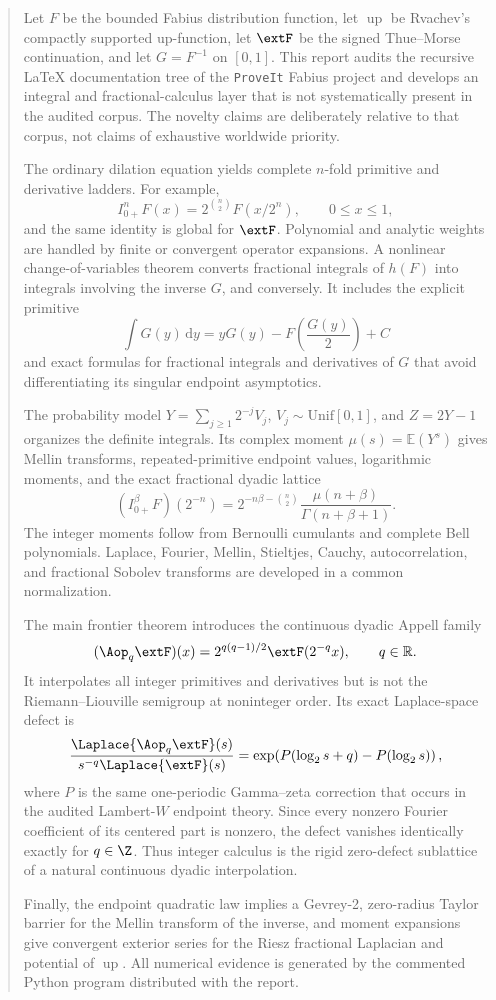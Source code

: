 \documentclass[11pt,oneside]{article}
\theoremstyle{definition}
\theoremstyle{remark}
\newcommand{\Up}{\operatorname{up}}
\newcommand{\E}{\mathbb E}
\newcommand{\R}{\mathbb R}
\newcommand{\dd}{\,\mathrm d}
\newcommand{\1}{\mathbf 1}
\begin{document}
\begin{abstract}
Let $F$ be the bounded Fabius distribution function, let $\Up$ be Rvachev's compactly
supported up-function, let $\extF$ be the signed Thue--Morse continuation, and let
$G=F^{-1}$ on $[0,1]$.  This report audits the recursive LaTeX documentation tree of the
\texttt{ProveIt} Fabius project and develops an integral and fractional-calculus layer that
is not systematically present in the audited corpus.  The novelty claims are deliberately
relative to that corpus, not claims of exhaustive worldwide priority.

The ordinary dilation equation yields complete $n$-fold primitive and derivative ladders.
For example,
\[
 I_{0+}^{n}F(x)=2^{\binom n2}F(x/2^n),\qquad 0\le x\le1,
\]
and the same identity is global for $\extF$.  Polynomial and analytic weights are handled by
finite or convergent operator expansions.  A nonlinear change-of-variables theorem converts
fractional integrals of $h(F)$ into integrals involving the inverse $G$, and conversely.  It
includes the explicit primitive
\[
 \int G(y)\dd y=yG(y)-F\!\left(\frac{G(y)}2\right)+C
\]
and exact formulas for fractional integrals and derivatives of $G$ that avoid differentiating
its singular endpoint asymptotics.

The probability model
$Y=\sum_{j\ge1}2^{-j}V_j$, $V_j\sim\mathrm{Unif}[0,1]$, and $Z=2Y-1$ organizes the
definite integrals.  Its complex moment $\mu(s)=\E(Y^s)$ gives Mellin transforms,
repeated-primitive endpoint values, logarithmic moments, and the exact fractional dyadic
lattice
\[
 (I_{0+}^{\beta}F)(2^{-n})=
 2^{-n\beta-\binom n2}\frac{\mu(n+\beta)}{\Gamma(n+\beta+1)}.
\]
The integer moments follow from Bernoulli cumulants and complete Bell polynomials.
Laplace, Fourier, Mellin, Stieltjes, Cauchy, autocorrelation, and fractional Sobolev transforms
are developed in a common normalization.

The main frontier theorem introduces the continuous dyadic Appell family
\[
 (\Aop_q\extF)(x)=2^{q(q-1)/2}\extF(2^{-q}x),\qquad q\in\R.
\]
It interpolates all integer primitives and derivatives but is not the
Riemann--Liouville semigroup at noninteger order.  Its exact Laplace-space defect is
\[
 \frac{\Laplace\{\Aop_q\extF\}(s)}{s^{-q}\Laplace\{\extF\}(s)}
 =\exp\!\left(P(\log_2s+q)-P(\log_2s)\right),
\]
where $P$ is the same one-periodic Gamma--zeta correction that occurs in the audited
Lambert-$W$ endpoint theory.  Since every nonzero Fourier coefficient of its centered part is
nonzero, the defect vanishes identically exactly for $q\in\Z$.  Thus integer calculus is the
rigid zero-defect sublattice of a natural continuous dyadic interpolation.

Finally, the endpoint quadratic law implies a Gevrey-2, zero-radius Taylor barrier for the
Mellin transform of the inverse, and moment expansions give convergent exterior series for the
Riesz fractional Laplacian and potential of $\Up$.  All numerical evidence is generated by the
commented Python program distributed with the report.
\end{abstract}
\end{document}
